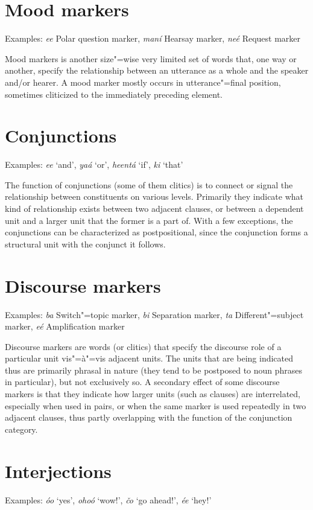 \section{Mood markers}
\label{sec:3b-11}
Examples: \textit{ee} Polar question marker, \textit{maní} Hearsay marker, \textit{neé} Request marker


Mood markers is another size"=wise very limited set of words that, one way or another, specify the relationship between an utterance as a whole and the speaker and/or hearer. A mood marker mostly occurs in utterance"=final position, sometimes cliticized to the immediately preceding element.


\section{Conjunctions}
\label{sec:3b-12}
Examples: \textit{ee} `and', \textit{yaá} `or', \textit{heentá} `if', \textit{ki} `that'


The function of conjunctions (some of them clitics) is to connect or signal the relationship between constituents on various levels. Primarily they indicate what kind of relationship exists between two adjacent clauses, or between a dependent unit and a larger unit that the former is a part of. With a few exceptions, the conjunctions can be characterized as postpositional, since the conjunction forms a structural unit with the conjunct it follows.


\section{Discourse markers}
\label{sec:3b-13}
Examples: \textit{ba} Switch"=topic marker, \textit{bi} Separation marker, \textit{ta} Different"=subject marker, \textit{eé} Amplification marker 


Discourse markers are words (or clitics) that specify the discourse role of a particular unit vis"=à"=vis adjacent units. The units that are being indicated thus are primarily phrasal in nature (they tend to be postposed to noun phrases in particular), but not exclusively so. A secondary effect of some discourse markers is that they indicate how larger units (such as clauses) are interrelated, especially when used in pairs, or when the same marker is used repeatedly in two adjacent clauses, thus partly overlapping with the function of the conjunction category.


\section{Interjections}
\label{sec:3b-14}
Examples: \textit{óo} `yes', \textit{ohoó} `wow!', \textit{čo} `go ahead!', \textit{ée} `hey!'


